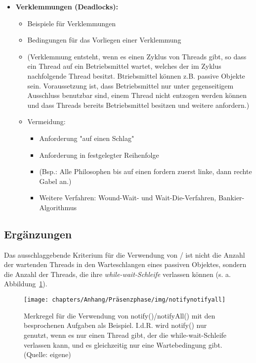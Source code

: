 \begin{itemize}
        \item \textbf{Verklemmungen (Deadlocks):}
        \begin{itemize}
            \item Beispiele für Verklemmungen
            \item Bedingungen für das Vorliegen einer Verklemmung
            \item[] (Verklemmung entsteht, wenn es einen Zyklus von Threads gibt, so dass ein Thread auf ein Betriebsmittel wartet, welches der im Zyklus nachfolgende Thread besitzt. Btriebsmittel können z.B. passive Objekte sein. Voraussetzung ist, dass Betriebsmittel nur unter gegenseitigem Ausschluss benutzbar sind, einem Thread nicht entzogen werden können und dass Threads bereits Betriebsmittel besitzen und weitere anfordern.)
            \item Vermeidung:
            \begin{itemize}
                \item Anforderung "auf einen Schlag"
                \item Anforderung in festgelegter Reihenfolge
                \item[] (Bsp.: Alle Philosophen bis auf einen fordern zuerst linke, dann rechte Gabel an.)
                \item Weitere Verfahren: Wound-Wait- und Wait-Die-Verfahren, Bankier-Algorithmus
            \end{itemize}
        \end{itemize}

    \end{itemize}

\subsection{Ergänzungen}
\begin{tcolorbox}
    Das ausschlaggebende Kriterium für die Verwendung von  /  ist nicht die Anzahl der wartenden Threads in den Warteschlangen eines passiven Objektes, sondern die Anzahl der Threads, die ihre \textit{while-wait-Schleife} verlassen können (s. a. Abbildung~\ref{fig:notifynotifyall}).
\end{tcolorbox}

\begin{figure}
    \centering
    \texttt{[image: chapters/Anhang/Präsenzphase/img/notifynotifyall]}
    \caption{Merkregel für die Verwendung von notify()/notifyAll() mit den besprochenen Aufgaben als Beispiel. I.d.R. wird notify() nur genutzt, wenn es nur einen Thread gibt, der die while-wait-Schleife verlassen kann, und es gleichzeitig nur eine Wartebedingung gibt. (Quelle: eigene)}
    \label{fig:notifynotifyall}
\end{figure}
